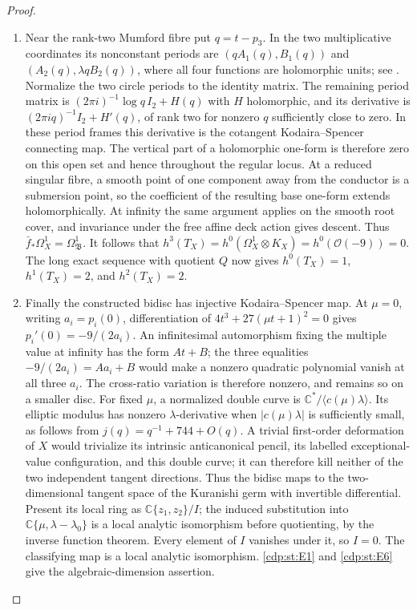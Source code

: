 \begin{proof}
\begin{enumerate}[label=\arabic*.,leftmargin=*]
\item Near the rank-two Mumford fibre put $q=t-p_3$. In the two
multiplicative coordinates its nonconstant periods are
$(qA_1(q),B_1(q))$ and $(A_2(q),\lambda qB_2(q))$, where all four
functions are holomorphic units; see
\cite[equation~(3.1) and Proposition~3.1, p.~6]{Viaclovsky2026Two}.
Normalize the two circle periods to the identity matrix. The remaining
period matrix is $(2\pi i)^{-1}\log q\,I_2+H(q)$ with $H$ holomorphic,
and its derivative is $(2\pi iq)^{-1}I_2+H'(q)$, of rank two for
nonzero $q$ sufficiently close to zero. In these period frames this
derivative is the cotangent Kodaira--Spencer connecting map.
The vertical part of a holomorphic one-form is therefore zero on
this open set and hence throughout the regular locus.
At a reduced singular fibre, a smooth point of one component away
from the conductor is a submersion point, so the coefficient of
the resulting base one-form extends holomorphically. At infinity
the same argument applies on the smooth root cover, and invariance
under the free affine deck action gives descent. Thus
$\bar f_*\Omega_X^1=\Omega_{\mathfrak B}^1$.
It follows that
$h^3(T_X)=h^0(\Omega_X^1\otimes K_X)
=h^0(\mathcal O(-9))=0$. The long exact sequence with quotient
$Q$ now gives $h^0(T_X)=1$, $h^1(T_X)=2$, and $h^2(T_X)=2$.

\item Finally the constructed bidisc has injective Kodaira--Spencer map.
At $\mu=0$, writing $a_i=p_i(0)$, differentiation of
$4t^3+27(\mu t+1)^2=0$ gives $p_i'(0)=-9/(2a_i)$.
An infinitesimal automorphism fixing the multiple value at infinity
has the form $At+B$; the three equalities
$-9/(2a_i)=Aa_i+B$ would make a nonzero quadratic polynomial vanish
at all three $a_i$. The cross-ratio variation is therefore nonzero,
and remains so on a smaller disc. For fixed $\mu$, a normalized
double curve is $\mathbb C^*/\langle c(\mu)\lambda\rangle$.
Its elliptic modulus has nonzero $\lambda$-derivative when
$|c(\mu)\lambda|$ is sufficiently small, as follows from
$j(q)=q^{-1}+744+O(q)$. A trivial first-order deformation of $X$
would trivialize its intrinsic anticanonical pencil, its labelled
exceptional-value configuration, and this double curve; it can
therefore kill neither of the two independent tangent directions.
Thus the bidisc maps to the two-dimensional tangent space of the
Kuranishi germ with invertible differential. Present its local
ring as $\mathbb C\{z_1,z_2\}/I$; the induced substitution into
$\mathbb C\{\mu,\lambda-\lambda_0\}$ is a local analytic
isomorphism before quotienting, by the inverse function theorem.
Every element of $I$ vanishes under it, so $I=0$. The classifying
map is a local analytic isomorphism. \ref{cdp:st:E1} and \ref{cdp:st:E6} give the algebraic-dimension assertion.

\end{enumerate}
\end{proof}